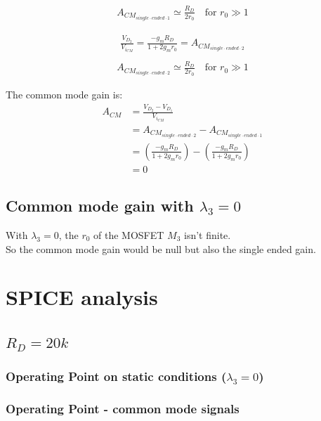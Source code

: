 \begin{align}
A_{CM_{single\cdot ended\cdot 1}} \simeq \frac{R_{D}}{2r_0} \quad \text{for } r_0 \gg 1
\end{align}

\begin{align}
\frac{V_{D_2}}{V_{i_{CM}}} = \frac{-g_m R_{D}}{1+2g_m r_0} = A_{CM_{single\cdot ended\cdot 2}}\\
\end{align}
\begin{align}
A_{CM_{single\cdot ended\cdot 2}} \simeq \frac{R_{D}}{2r_0} \quad \text{for } r_0 \gg 1
\end{align}

The common mode gain is:\\
\begin{align}
A_{CM} &= \frac{V_{D_2} - V_{D_1}}{V_{i_{CM}}}\\
&= A_{CM_{single\cdot ended\cdot 2}} -A_{CM_{single\cdot ended\cdot 1}} \\
&= \left(\frac{-g_m R_{D}}{1+2g_m r_0} \right) - \left(\frac{-g_m R_{D}}{1+2g_m r_0} \right)\\
&= 0
\end{align}

\subsection{Common mode gain with $\lambda_3 = 0$}
With $\lambda_3 = 0$, the $r_0$ of the MOSFET $M_3$ isn't finite.\\
So the common mode gain would be null but also the single ended gain.\par

\clearpage
\section{SPICE analysis}
\subsection{$R_D = 20k$}
\subsubsection{Operating Point on static conditions ($\lambda_3 = 0$)}



\subsubsection{Operating Point - common mode signals}



